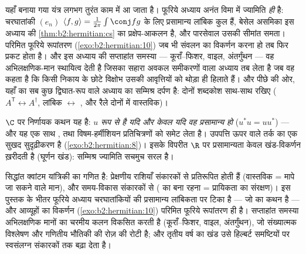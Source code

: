 \begin{remark}[इसी खंड के भीतर के परिप्रेक्ष्य]
यहाँ बनाया गया  यंत्र लगभग तुरंत काम में आ जाता है। फूरिये
अध्याय अनंत विमा में  ज्यामिति \emph{ही} है: चरघातांकी $(e_n)$ $\langle f, g\rangle =
\frac{1}{2\pi}\int\conj fg$
के लिए प्रसामान्य लांबिक कुल हैं, बेसेल असमिका इस अध्याय की \cref{thm:b2:hermitian:cs} का
प्रक्षेप-आकलन है, और पारसेवाल उसकी सीमांत समता। परिमित फूरिये रूपांतरण
(\cref{exo:b2:hermitian:10}) जब भी संवलन का विकर्णन करना हो तब फिर प्रकट होता है। और इस अध्याय
की सप्ताहांत समस्या --- कूराँ--फिशर, वाइल, अंतर्गुंथन --- वह अभिलक्षणिक-मान
स्थायित्व देती है जिसका सहारा अवकल समीकरणों वाला अध्याय तब लेता है जब वह
कहता है कि किसी निकाय के छोटे विक्षोभ उसकी आवृत्तियों को थोड़ा ही हिलाते
हैं। और पीछे की ओर, यहाँ का सब कुछ द्विघात-रूप वाले अध्याय का सम्मिश्र
दर्पण है: दोनों शब्दकोश साथ-साथ रखिए ($A^{\mathsf T} \leftrightarrow
A^\dagger$, लांबिक $\leftrightarrow$ , और रैले
दोनों में वास्तविक)।
\end{remark}

\begin{remark}[प्रसामान्य अंतःरूपांतरण]
$\C$ पर निर्णायक कथन यह है: $u$ \emph{ रूप से  है यदि और
केवल यदि वह प्रसामान्य हो} ($u^*u = uu^*$) --- और यह एक साथ ,  तथा
विषम-हर्मीशियन प्रतिचित्रणों को समेट लेता है। उपपत्ति ऊपर वाले तर्क का
एक सुखद सुदृढ़ीकरण है (\cref{exo:b2:hermitian:8})। इसके विपरीत $\R$ पर प्रसामान्यता केवल
खंड-विकर्णन ख़रीदती है (घूर्णन खंड): सम्मिश्र ज्यामिति सचमुच सरल है।
\end{remark}

\begin{remark}[यह कहाँ काम आता है]
  सिद्धांत क्वांटम यांत्रिकी का गणित है: प्रेक्षणीय
राशियाँ  संकारकों से प्रतिरूपित होती हैं (वास्तविक  =
मापे जा सकने वाले मान), और समय-विकास  संकारकों से ( का बना
रहना = प्रायिकता का संरक्षण)। इस पुस्तक के भीतर फूरिये अध्याय चरघातांकियों
की प्रसामान्य लांबिकता पर टिका है --- जो  का कथन है
--- और  आव्यूहों का विकर्णन (\cref{exo:b2:hermitian:10}) परिमित फूरिये रूपांतरण ही है।
सप्ताहांत समस्या अभिलक्षणिक मानों का चरमीय कलन विकसित करती है
(कूराँ--फिशर, वाइल, अंतर्गुंथन), जो संख्यात्मक विश्लेषण और गणितीय भौतिकी
की रोज़ की रोटी है; और तृतीय वर्ष का खंड उसे हिल्बर्ट समष्टियों पर 
स्वसंलग्न संकारकों तक बढ़ा देता है।
\end{remark}

